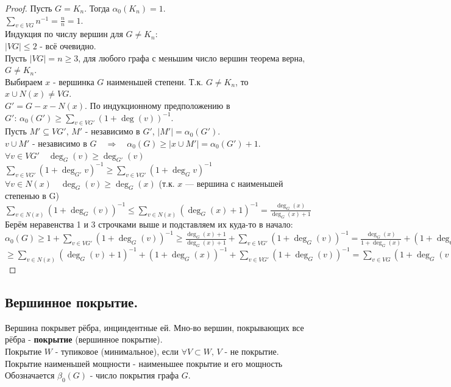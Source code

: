 \documentclass[12pt]{article}
\begin{document}
	\begin{proof}
		Пусть $G = K_n$. Тогда $\alpha_0(K_n) = 1$.\\
		$ \displaystyle \sum_{v \in VG} n^{-1} = \frac{n}{n} = 1$.\\
		Индукция по числу вершин для $G\ne K_n$:\\
		$|VG| \le 2$ - всё очевидно.\\
		Пусть $|VG| = n \ge 3$, для любого графа с меньшим число вершин теорема верна, $ G \ne K_n$.\\
		Выбираем $x$ - вершинка $G$ наименьшей степени. Т.к. $ G \ne K_n$, то $x \cup N(x) \ne VG$.\\
		$G' = G - x - N(x)$. По индукционному предположению в $ \displaystyle G': \, \alpha_0(G') \ge \sum_{v \in VG'} (1+ \operatorname{deg}(v))^{-1}$.\\
		Пусть $M' \subseteq VG', \, M'$ - независимо в $G'$, $|M'| = \alpha_0(G')$.\\
		$v \cup M'$ - независимо в $G \quad  \Rightarrow  \quad \alpha_0(G) \ge |x \cup M'| = \alpha_0(G')+1$.\\
		$\forall v \in VG' \quad  \operatorname{deg}_G(v) \ge  \operatorname{deg}_{G'}(v)$\\
		$ \displaystyle \sum_{v \in VG'} (1+ \operatorname{deg}_{G'} v)^{-1} \ge\sum_{v \in VG'} (1+ \operatorname{deg}_{G} v)^{-1}$\\
		$\forall v \in N(x) \quad  \operatorname{deg}_G(v) \ge  \operatorname{deg}_G(x)$ (т.к. $x$ — вершина с наименьшей степенью в G)\\
		$ \displaystyle \sum_{v \in N(x)} (1+ \operatorname{deg}_G(v))^{-1} \le \sum_{v \in N(x)}( \operatorname{deg}_G(x)+1)^{-1} = \frac{ \operatorname{deg}_G(x)}{\operatorname{deg}_G(x)+1}$\\
		Берём неравенства 1 и 3 строчками выше и подставляем их куда-то в начало:\\
		$ \displaystyle \alpha_0(G) \ge 1 + \sum_{v \in VG'} (1+ \operatorname{deg}_G(v))^{-1} \ge \frac{ \operatorname{deg}_G(x)+1}{\operatorname{deg}_G(x)+1}+\sum_{v\in VG'}(1+ \operatorname{deg}_G(v))^{-1} = \frac{ \operatorname{deg}_G(x)}{1+\operatorname{deg}_G(x)} + (1+ \operatorname{deg}_G(x))^{-1} + \sum_{v \in VG'} (1+ \operatorname{deg}_G(v))^{-1}$
		$ \displaystyle \ge \sum_{v \in N(x)}( \operatorname{deg}_G(v)+1)^{-1} + (1+ \operatorname{deg}_G(x))^{-1} + \sum_{v \in VG'}(1 +  \operatorname{deg}_G(v))^{-1} = \sum_{v\in VG}(1+ \operatorname{deg}_G(v))^{-1}$
	\end{proof}
\subsection{Вершинное покрытие.}
	Вершина покрывет рёбра, инциндентные ей. Мно-во вершин, покрывающих все рёбра - \textbf{покрытие} (вершинное покрытие).\\
	Покрытие $W$ - тупиковое (минимальное), если $\forall V \subset W, \, V$ - не покрытие. Покрытие наименьшей мощности - наименьшее покрытие и его мощность
	Обозначается $\beta_0(G)$ - число покрытия графа $G$.
\end{document}
